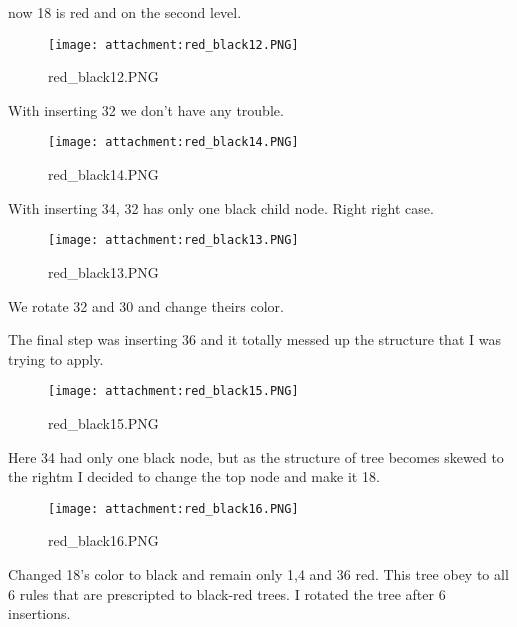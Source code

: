 \documentclass[11pt]{article}
\makeatletter
\def\maxwidth{\ifdim\Gin@nat@width>\linewidth\linewidth
    \else\Gin@nat@width\fi}
\let\Oldincludegraphics\includegraphics
\renewcommand{\includegraphics}[1]{\Oldincludegraphics[width=.8\maxwidth]{#1}}
\makeatother
\begin{document}
    now 18 is red and on the second level.

    \begin{figure}
\centering
\texttt{[image: attachment:red\_black12.PNG]}
\caption{red\_black12.PNG}
\end{figure}

    With inserting 32 we don't have any trouble.

    \begin{figure}
\centering
\texttt{[image: attachment:red\_black14.PNG]}
\caption{red\_black14.PNG}
\end{figure}

    With inserting 34, 32 has only one black child node. Right right case.

    \begin{figure}
\centering
\texttt{[image: attachment:red\_black13.PNG]}
\caption{red\_black13.PNG}
\end{figure}

    We rotate 32 and 30 and change theirs color.

    The final step was inserting 36 and it totally messed up the structure
that I was trying to apply.

    \begin{figure}
\centering
\texttt{[image: attachment:red\_black15.PNG]}
\caption{red\_black15.PNG}
\end{figure}

    Here 34 had only one black node, but as the structure of tree becomes
skewed to the rightm I decided to change the top node and make it 18.

    \begin{figure}
\centering
\texttt{[image: attachment:red\_black16.PNG]}
\caption{red\_black16.PNG}
\end{figure}

    Changed 18's color to black and remain only 1,4 and 36 red. This tree
obey to all 6 rules that are prescripted to black-red trees. I rotated
the tree after 6 insertions.


    
    
    
    
\end{document}
